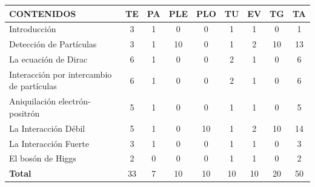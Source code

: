 \begin{center}
\begin{tabularx}{\textwidth}{|X|c|c|c|c|c|c|c|c|}
\hline\hline
\footnotesize{\textbf{CONTENIDOS}} & \footnotesize{\textbf{TE}} & \footnotesize{\textbf{PA}} & \footnotesize{\textbf{PLE}} & \footnotesize{\textbf{PLO}} & \footnotesize{\textbf{TU}} & \footnotesize{\textbf{EV}} & \footnotesize{\textbf{TG}} & \footnotesize{\textbf{TA}}\\
\hline\hline
\footnotesize{Introducción}            & \footnotesize{3} & \footnotesize{1} & \footnotesize{0}  & \footnotesize{0}  & \footnotesize{1} & \footnotesize{1} & \footnotesize{0} & \footnotesize{1} \\
\hline
\footnotesize{Detección de Partículas} & \footnotesize{3} & \footnotesize{1} & \footnotesize{10} & \footnotesize{0}  & \footnotesize{1} & \footnotesize{2} & \footnotesize{10} & \footnotesize{13} \\
\hline 
\footnotesize{La ecuación de Dirac}    & \footnotesize{6} & \footnotesize{1} & \footnotesize{0}  & \footnotesize{0}  & \footnotesize{2} & \footnotesize{1} & \footnotesize{0} & \footnotesize{6} \\ 
\hline
\footnotesize{Interacción por intercambio de partículas} & \footnotesize{6} & \footnotesize{1} & \footnotesize{0} & \footnotesize{0} & \footnotesize{2} & \footnotesize{1} & \footnotesize{0} & \footnotesize{6} \\
\hline
\footnotesize{Aniquilación electrón-positrón} & \footnotesize{5} & \footnotesize{1} & \footnotesize{0} & \footnotesize{0} & \footnotesize{1} & \footnotesize{1} & \footnotesize{0} & \footnotesize{5} \\
\hline
\footnotesize{La Interacción Débil} & \footnotesize{5} & \footnotesize{1} & \footnotesize{0} & \footnotesize{10} & \footnotesize{1} & \footnotesize{2} & \footnotesize{10} & \footnotesize{14} \\
\hline
\footnotesize{La Interacción Fuerte} & \footnotesize{3} & \footnotesize{1} & \footnotesize{0} & \footnotesize{0} & \footnotesize{1} & \footnotesize{1} & \footnotesize{0} & \footnotesize{3} \\
\hline
\footnotesize{El bosón de Higgs} & \footnotesize{2} & \footnotesize{0} & \footnotesize{0} & \footnotesize{0} & \footnotesize{1} & \footnotesize{1} & \footnotesize{0} & \footnotesize{2} \\
\hline\hline
\textbf{\footnotesize{Total}} & \footnotesize{33} & \footnotesize{7} & \footnotesize{10} & \footnotesize{10} & \footnotesize{10} & \footnotesize{10} & \footnotesize{20} & \footnotesize{50} \\
\hline\hline
\end{tabularx}
\end{center}

